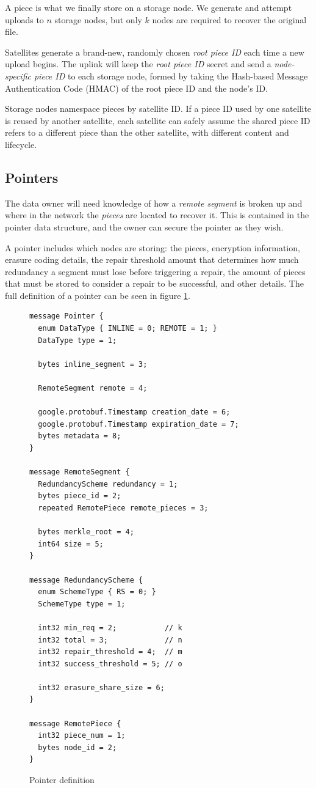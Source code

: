 \documentclass[11pt,fleqn,openany]{book}
\begin{document}
A piece is what
we finally store on a storage node. We generate and attempt uploads to $n$
storage nodes, but only $k$ nodes are required to recover the original file.

Satellites generate a brand-new, randomly chosen {\em root piece ID} each time
a new upload begins. The uplink will keep the {\em root piece ID} secret and send
a {\em node-specific piece ID} to each storage node, formed by taking the Hash-based
Message Authentication Code (HMAC) of the root piece ID and the node's ID.

Storage nodes namespace pieces by satellite ID. If a piece ID used by one
satellite is reused by another satellite, each satellite can safely assume the shared piece ID refers
to a different piece than the other satellite, with different content and lifecycle.

\subsection{Pointers}

The data owner will need knowledge of how a {\em remote segment} is broken up and
where in the network the {\em pieces} are located to recover it. This is contained
in the pointer data structure, and the owner can secure the pointer as
they wish.

A pointer includes which nodes are storing: the pieces,
encryption information, erasure coding details,
the repair threshold amount that determines how much redundancy a segment
must lose before triggering a repair, the amount of pieces that must be
stored to consider a repair to be successful, and other details. The full
definition of a pointer can be seen in figure \ref{fig:pointer}.

\begin{figure}
\lstset{language=protobuf}
\begin{lstlisting}
message Pointer {
  enum DataType { INLINE = 0; REMOTE = 1; }
  DataType type = 1;

  bytes inline_segment = 3;

  RemoteSegment remote = 4;

  google.protobuf.Timestamp creation_date = 6;
  google.protobuf.Timestamp expiration_date = 7;
  bytes metadata = 8;
}

message RemoteSegment {
  RedundancyScheme redundancy = 1;
  bytes piece_id = 2;
  repeated RemotePiece remote_pieces = 3;

  bytes merkle_root = 4;
  int64 size = 5;
}

message RedundancyScheme {
  enum SchemeType { RS = 0; }
  SchemeType type = 1;

  int32 min_req = 2;           // k
  int32 total = 3;             // n
  int32 repair_threshold = 4;  // m
  int32 success_threshold = 5; // o

  int32 erasure_share_size = 6;
}

message RemotePiece {
  int32 piece_num = 1;
  bytes node_id = 2;
}
\end{lstlisting}
\caption{Pointer definition}
\label{fig:pointer}
\end{figure}
\end{document}
